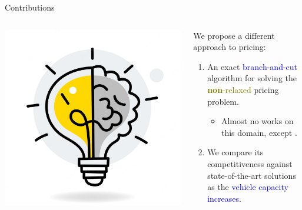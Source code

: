 \begin{frame}{Contributions}
	\begin{columns}
		\begin{column}{0.3\textwidth}
			\centering
			\includegraphics[width=\textwidth]{./Imgs/idea.png}
		\end{column}
		\begin{column}{0.7\textwidth}
			We propose a different approach to pricing:
			\begin{enumerate}
				\item An exact \textcolor{blue}{branch-and-cut} algorithm for solving the \textcolor{olive}{\textbf{non}-relaxed} pricing problem.
				      \begin{itemize}
					      \item Almost no works on this domain, except \parencite{jepsen2014}.
				      \end{itemize}
				\item We compare its competitiveness against state-of-the-art solutions as the \textcolor{blue}{vehicle capacity increases}.
			\end{enumerate}
		\end{column}
	\end{columns}
\end{frame}

